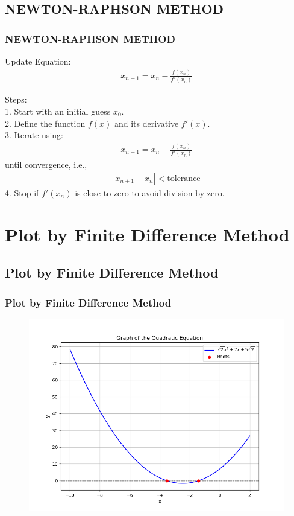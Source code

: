 \documentclass{beamer}
\theoremstyle{remark}
\providecommand{\abs}[1]{\left\vert#1\right\vert}
\numberwithin{equation}{section}
\begin{document}
\subsection{NEWTON-RAPHSON METHOD}
\begin{frame}
\frametitle{NEWTON-RAPHSON METHOD}

Update Equation:
\begin{align}
 x_{n+1} = x_n - \frac{f(x_n)}{f'(x_n)}   
\end{align}

Steps:\\
1. Start with an initial guess $ x_0 $.\\
2. Define the function \( f(x) \) and its derivative  $f'(x)$.\\
3. Iterate using:
   \begin{align}
   x_{n+1} = x_n - \frac{f(x_n)}{f'(x_n)}
   \end{align}
   until convergence, i.e.,
   \begin{align}
   \abs{x_{n+1} - x_n} < \text{tolerance}
   \end{align}
4. Stop if $f'(x_n)$ is close to zero to avoid division by zero.
\end{frame}

\section{Plot by Finite Difference Method}
\subsection{Plot by Finite Difference Method}
\begin{frame}
\frametitle{Plot by Finite Difference Method}


\begin{figure}[h!]
   \centering
   \includegraphics[width=0.7\linewidth]{figs/Figure_2.png}
   \label{Graph by Finite difference Method}
\end{figure}

\end{frame}
\end{document}
